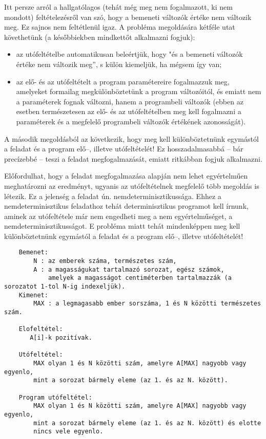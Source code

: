 \documentclass[margin=0px]{article}
\begin{document}
Itt persze arról a hallgatólagos (tehát még meg nem fogalmazott, ki nem mondott) feltételezésről van szó, hogy a bemeneti változók értéke nem változik meg. Ez sajnos nem feltétlenül igaz. A probléma megoldására kétféle utat követhetünk (a későbbiekben mindkettőt alkalmazni fogjuk):

\begin{itemize}
    \item	az utófeltételbe automatikusan beleértjük, hogy "és a bemeneti változók értéke nem változik meg”, s külön kiemeljük, ha mégsem így van;
    \item az elő- és az utófeltételt a program paramétereire fogalmazzuk meg, amelyeket formailag megkülönböztetünk a program változóitól, és emiatt nem a paraméterek fognak változni, hanem a programbeli változók (ebben az esetben természetesen az elő- és az utófeltételben meg kell fogalmazni a paraméterek és a megfelelő programbeli változók értékének azonosságát).
\end{itemize}

A második megoldásból az következik, hogy meg kell különböztetnünk egymástól a feladat és a program elő–, illetve utófeltételét! Ez hosszadalmasabbá – bár precízebbé – teszi a feladat megfogalmazását, emiatt ritkábban fogjuk alkalmazni.

Előfordulhat, hogy a feladat megfogalmazása alapján nem lehet egyértelműen meghatározni az eredményt, ugyanis az utófeltételnek megfelelő több megoldás is létezik. Ez a jelenség a feladat ún. nemdeterminisztikussága. Ehhez a nemdeterminisztikus feladathoz tehát determinisztikus programot kell írnunk, aminek az utófeltétele már nem engedheti meg a nem egyértelműséget, a nemdeterminisztikusságot. E probléma miatt tehát mindenképpen meg kell különböztetnünk egymástól a feladat és a program elő–, illetve utófeltételét!

\begin{verbatim}
	Bemenet: 
    	N : az emberek száma, természetes szám,
    	A : a magasságukat tartalmazó sorozat, egész számok, 
        	amelyek a magasságot centiméterben tartalmazzák (a sorozatot 1-tol N-ig indexeljük).
	Kimenet:	
    	MAX : a legmagasabb ember sorszáma, 1 és N közötti természetes szám.
	
	Elofeltétel: 
	   A[i]-k pozitívak.
	
   	Utófeltétel: 	
     	MAX olyan 1 és N közötti szám, amelyre A[MAX] nagyobb vagy egyenlo, 	
	    mint a sorozat bármely eleme (az 1. és az N. között).
	    
	Program utófeltétel: 	
	   	MAX olyan 1 és N közötti szám, amelyre A[MAX] nagyobb vagy egyenlo, 	
	   	mint a sorozat bármely eleme (az 1. és az N. között) és elotte
	   	nincs vele egyenlo.
	\end{verbatim}
\end{document}
